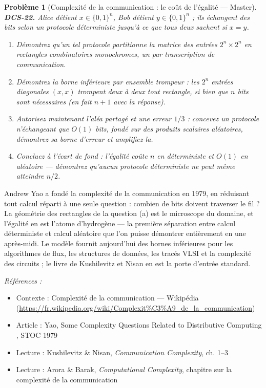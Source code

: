 \documentclass[11pt]{article}
\newtheorem{problem}{Problème}
\newenvironment{refs}{\par\small\noindent\emph{Références :}\begin{itemize}\setlength\itemsep{0pt}}{\end{itemize}\normalsize}
\begin{document}
\bigskip

\begin{problem}[{Complexité de la communication : le coût de l'égalité --- Master}]
\textbf{DCS-22.} Alice détient $x \in \{0,1\}^n$, Bob détient $y \in \{0,1\}^n$ ; ils échangent des bits selon un protocole déterministe jusqu'à ce que tous deux sachent si $x = y$.
\begin{enumerate}
\item[(a)] Démontrez qu'un tel protocole partitionne la matrice des entrées $2^n \times 2^n$ en rectangles combinatoires monochromes, un par transcription de communication.
\item[(b)] Démontrez la borne inférieure par ensemble trompeur : les $2^n$ entrées diagonales $(x, x)$ trompent deux à deux tout rectangle, si bien que $n$ bits sont nécessaires (en fait $n + 1$ avec la réponse).
\item[(c)] Autorisez maintenant l'aléa partagé et une erreur $1/3$ : concevez un protocole n'échangeant que $O(1)$ bits, fondé sur des produits scalaires aléatoires, démontrez sa borne d'erreur et amplifiez-la.
\item[(d)] Concluez à l'écart de fond : l'égalité coûte $n$ en déterministe et $O(1)$ en aléatoire --- démontrez qu'aucun protocole déterministe ne peut même atteindre $n/2$.
\end{enumerate}

\end{problem}

\noindent Andrew Yao a fondé la complexité de la communication en 1979, en réduisant tout calcul réparti à une seule question : combien de bits doivent traverser le fil ? La géométrie des rectangles de la question (a) est le microscope du domaine, et l'égalité en est l'atome d'hydrogène --- la première séparation entre calcul déterministe et calcul aléatoire que l'on puisse démontrer entièrement en une après-midi. Le modèle fournit aujourd'hui des bornes inférieures pour les algorithmes de flux, les structures de données, les tracés VLSI et la complexité des circuits ; le livre de Kushilevitz et Nisan en est la porte d'entrée standard.

\begin{refs}
\item Contexte : Complexité de la communication --- Wikipédia (\url{https://fr.wikipedia.org/wiki/Complexit%C3%A9_de_la_communication})
\item Article : Yao, \og{} Some Complexity Questions Related to Distributive Computing \fg{}, STOC 1979
\item Lecture : Kushilevitz \& Nisan, \textit{Communication Complexity}, ch. 1--3
\item Lecture : Arora \& Barak, \textit{Computational Complexity}, chapitre sur la complexité de la communication
\end{refs}
\end{document}
